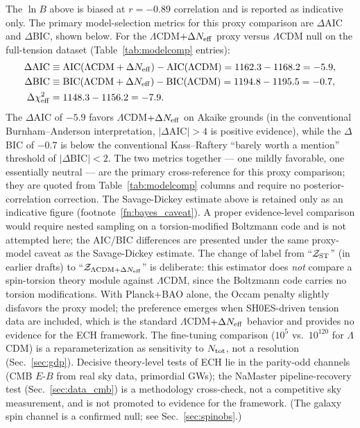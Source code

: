 \documentclass[aps,prd,twocolumn,superscriptaddress,showpacs,preprintnumbers,nofootinbib,longbibliography,floatfix]{revtex4-2}
\newcommand{\Neff}{N_{\rm eff}}
\begin{document}
The $\ln B$ above is biased at $r=-0.89$ correlation and is reported as indicative only. The primary model-selection metrics for this proxy comparison are $\Delta$AIC and $\Delta$BIC, shown below. For the $\Lambda$CDM$+\Delta\Neff$ proxy versus $\Lambda$CDM null on the full-tension dataset (Table~\ref{tab:modelcomp} entries):
\begin{align}
\Delta\text{AIC} &\equiv \text{AIC}(\Lambda\text{CDM}+\Delta\Neff) - \text{AIC}(\Lambda\text{CDM}) = 1162.3 - 1168.2 = -5.9, \nonumber \\
\Delta\text{BIC} &\equiv \text{BIC}(\Lambda\text{CDM}+\Delta\Neff) - \text{BIC}(\Lambda\text{CDM}) = 1194.8 - 1195.5 = -0.7, \nonumber \\
\Delta\chi^2_{\rm eff} &= 1148.3 - 1156.2 = -7.9.
\end{align}
The $\Delta$AIC of $-5.9$ favors $\Lambda$CDM$+\Delta\Neff$ on Akaike grounds (in the conventional Burnham--Anderson interpretation, $|\Delta\text{AIC}|>4$ is positive evidence), while the $\Delta$BIC of $-0.7$ is below the conventional Kass--Raftery ``barely worth a mention'' threshold of $|\Delta\text{BIC}|<2$. The two metrics together --- one mildly favorable, one essentially neutral --- are the primary cross-reference for this proxy comparison; they are quoted from Table~\ref{tab:modelcomp} columns and require no posterior-correlation correction. The Savage-Dickey estimate above is retained only as an indicative figure (footnote~\ref{fn:bayes_caveat}). A proper evidence-level comparison would require nested sampling on a torsion-modified Boltzmann code and is not attempted here; the AIC/BIC differences are presented under the same proxy-model caveat as the Savage-Dickey estimate. The change of label from ``$\mathcal{Z}_{\rm ST}$'' (in earlier drafts) to ``$\mathcal{Z}_{\Lambda\text{CDM}+\Delta\Neff}$'' is deliberate: this estimator does \emph{not} compare a spin-torsion theory module against $\Lambda$CDM, since the Boltzmann code carries no torsion modifications. With Planck+BAO alone, the Occam penalty slightly disfavors the proxy model; the preference emerges when SH0ES-driven tension data are included, which is the standard $\Lambda$CDM$+\Delta\Neff$ behavior and provides no evidence for the ECH framework. The fine-tuning comparison ($10^5$ vs.\ $10^{120}$ for $\Lambda$CDM) is a reparameterization as sensitivity to $N_{\rm tot}$, not a resolution (Sec.~\ref{sec:gdp}). Decisive theory-level tests of ECH lie in the parity-odd channels (CMB $E$-$B$ from real sky data, primordial GWs); the NaMaster pipeline-recovery test (Sec.~\ref{sec:data_cmb}) is a methodology cross-check, not a competitive sky measurement, and is not promoted to evidence for the framework. (The galaxy spin channel is a confirmed null; see Sec.~\ref{sec:spinobs}.)
\end{document}
